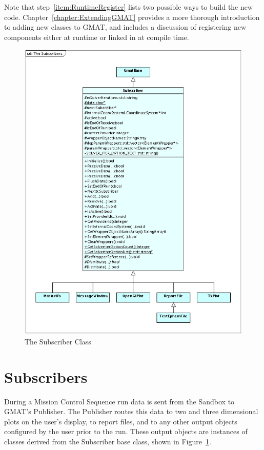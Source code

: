 Note that step~\ref{item:RuntimeRegister} lists two possible ways to build the new code.
Chapter~\ref{chapter:ExtendingGMAT} provides a more thorough introduction to adding new classes to
GMAT, and includes a discussion of registering new components either at runtime or linked in at
compile time.

\begin{figure}[htb]
\begin{center}
\includegraphics[scale=0.5]{Images/TheSubscribers.eps}
\caption{\label{figure:TheSubscribers}The Subscriber Class}
\end{center}
\end{figure}

\section{Subscribers}

During a Mission Control Sequence run data is sent from the Sandbox to GMAT's Publisher.  The
Publisher routes this data to two and three dimensional plots on the user's display, to report
files, and to any other output objects configured by the user prior to the run.  These output
objects are instances of classes derived from the Subscriber base class, shown in
Figure~\ref{figure:TheSubscribers}.

